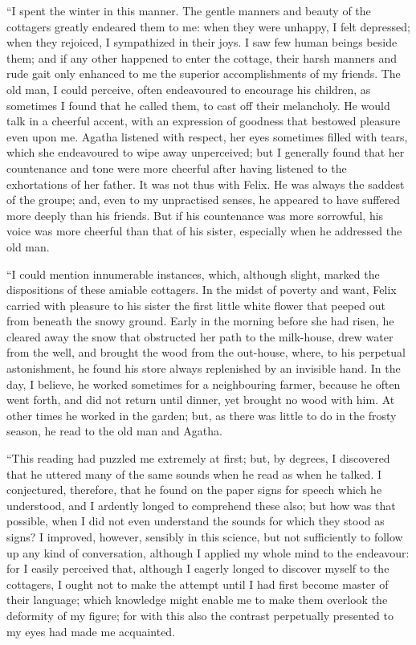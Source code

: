 ``I spent the winter in this manner.
The gentle manners and beauty of the
cottagers greatly endeared them to me:
when they were unhappy, I felt depressed;
when they rejoiced, I sympathized
in their joys. I saw few human beings
beside them; and if any other happened
to enter the cottage, their harsh manners
and rude gait only enhanced to me the
superior accomplishments of my friends.
The old man, I could perceive, often
endeavoured to encourage his children,
as sometimes I found that he called
them, to cast off their melancholy. He
would talk in a cheerful accent, with
an expression of goodness that bestowed
pleasure even upon me. Agatha listened
with respect, her eyes sometimes
filled with tears, which she endeavoured
to wipe away unperceived; but I generally
found that her countenance and
tone were more cheerful after having
listened to the exhortations of her father.
It was not thus with Felix. He
was always the saddest of the groupe;
and, even to my unpractised senses, he
appeared to have suffered more deeply
than his friends. But if his countenance
was more sorrowful, his voice
was more cheerful than that of his sister,
especially when he addressed the
old man.

``I could mention innumerable instances,
which, although slight, marked
the dispositions of these amiable cottagers.
In the midst of poverty and
want, Felix carried with pleasure to his
sister the first little white flower that
peeped out from beneath the snowy
ground. Early in the morning before
she had risen, he cleared away the
snow that obstructed her path to the
milk-house, drew water from the well,
and brought the wood from the out-house,
where, to his perpetual astonishment,
he found his store always replenished
by an invisible hand. In the
day, I believe, he worked sometimes
for a neighbouring farmer, because he
often went forth, and did not return
until dinner, yet brought no wood with
him. At other times he worked in the
garden; but, as there was little to do
in the frosty season, he read to the old
man and Agatha.

``This reading had puzzled me extremely
at first; but, by degrees, I discovered
that he uttered many of the
same sounds when he read as when he
talked. I conjectured, therefore, that
he found on the paper signs for speech
which he understood, and I ardently
longed to comprehend these also; but
how was that possible, when I did not
even understand the sounds for which
they stood as signs? I improved, however,
sensibly in this science, but not
sufficiently to follow up any kind of
conversation, although I applied my
whole mind to the endeavour: for I
easily perceived that, although I eagerly
longed to discover myself to the
cottagers, I ought not to make the attempt
until I had first become master
of their language; which knowledge
might enable me to make them overlook
the deformity of my figure; for
with this also the contrast perpetually
presented to my eyes had made me
acquainted.

